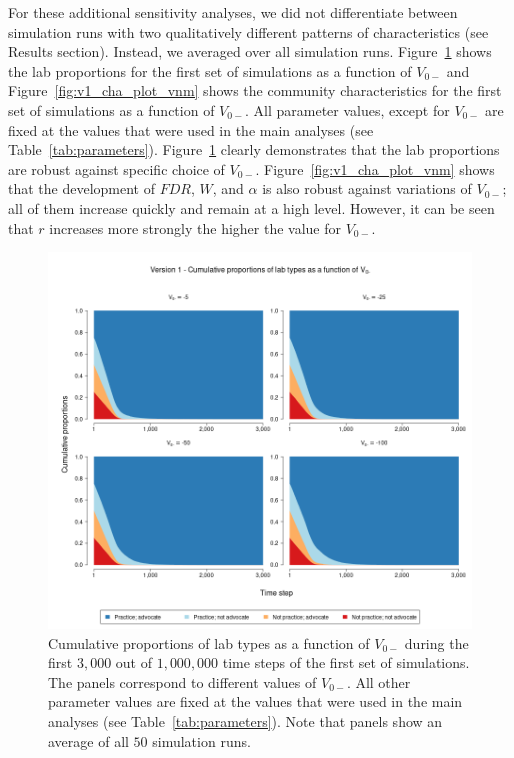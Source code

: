 \documentclass[meta, authordate,issue]{jote-new-article}
\begin{document}
For these additional sensitivity analyses, we did not differentiate between simulation runs with two qualitatively different patterns of characteristics (see Results section). Instead, we averaged over all simulation runs. Figure~\ref{fig:v1_pro_plot_vnm} shows the lab proportions for the first set of simulations as a function of $V_{0-}$ and Figure~\ref{fig:v1_cha_plot_vnm} shows the community characteristics for the first set of simulations as a function of $V_{0-}$. All parameter values, except for $V_{0-}$ are fixed at the values that were used in the main analyses (see Table~\ref{tab:parameters}). Figure~\ref{fig:v1_pro_plot_vnm} clearly demonstrates that the lab proportions are robust against specific choice of $V_{0-}$. Figure~\ref{fig:v1_cha_plot_vnm} shows that the development of $FDR$, $W$, and $\alpha$ is also robust against variations of $V_{0-}$; all of them increase quickly and remain at a high level. However, it can be seen that $r$ increases more strongly the higher the value for $V_{0-}$.
%
\begin{figure}
  \begin{fullwidth}
    \centering
    \includegraphics[width=\textwidth]{v1_pro_plot_vnm.png}
    \caption{Cumulative proportions of lab types as a function of $V_{0-}$ during the first $3,000$ out of $1,000,000$ time steps of the first set of simulations. The panels correspond to different values of $V_{0-}$. All other parameter values are fixed at the values that were used in the main analyses (see Table~\ref{tab:parameters}). Note that panels show an average of all $50$ simulation runs.}
    \label{fig:v1_pro_plot_vnm}
  \end{fullwidth}
\end{figure}
\end{document}
